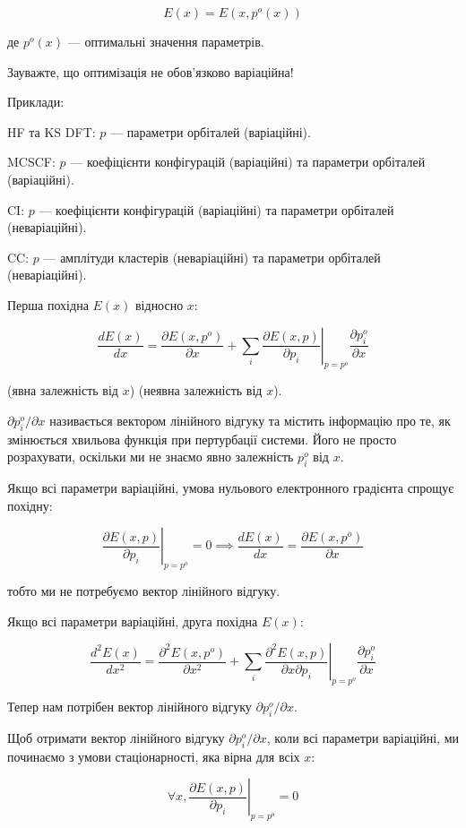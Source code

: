 \documentclass{PySCFBook}
\begin{document}
\[E(x) = E(x, p^o(x))\]

де \(p^o(x)\) — оптимальні значення параметрів.

Зауважте, що оптимізація не обов'язково варіаційна!

Приклади:

HF та KS DFT: \(p\) — параметри орбіталей (варіаційні).

MCSCF: \(p\) — коефіцієнти конфігурацій (варіаційні) та параметри орбіталей (варіаційні).

CI: \(p\) — коефіцієнти конфігурацій (варіаційні) та параметри орбіталей (неваріаційні).

CC: \(p\) — амплітуди кластерів (неваріаційні) та параметри орбіталей (неваріаційні).

Перша похідна \(E(x)\) відносно \(x\):

\[\frac{dE(x)}{dx} = \frac{\partial E(x, p^o)}{\partial x} + \sum_i \left. \frac{\partial E(x, p)}{\partial p_i} \right|_{p=p^o} \frac{\partial p^o_i}{\partial x}\]

(явна залежність від \(x\)) (неявна залежність від \(x\)).

\(\partial p^o_i / \partial x\) називається вектором лінійного відгуку та містить інформацію про те, як змінюється хвильова функція при пертурбації системи. Його не просто розрахувати, оскільки ми не знаємо явно залежність \(p^o_i\) від \(x\).

Якщо всі параметри варіаційні, умова нульового електронного градієнта спрощує похідну:

\[\left. \frac{\partial E(x, p)}{\partial p_i} \right|_{p=p^o} = 0 \implies \frac{dE(x)}{dx} = \frac{\partial E(x, p^o)}{\partial x}\]

тобто ми не потребуємо вектор лінійного відгуку.

Якщо всі параметри варіаційні, друга похідна \(E(x)\):

\[\frac{d^2 E(x)}{dx^2} = \frac{\partial^2 E(x, p^o)}{\partial x^2} + \sum_i \left. \frac{\partial^2 E(x, p)}{\partial x \partial p_i} \right|_{p=p^o} \frac{\partial p^o_i}{\partial x}\]

Тепер нам потрібен вектор лінійного відгуку \(\partial p^o_i / \partial x\).

Щоб отримати вектор лінійного відгуку \(\partial p^o_i / \partial x\), коли всі параметри варіаційні, ми починаємо з умови стаціонарності, яка вірна для всіх \(x\):

\[\forall x, \left. \frac{\partial E(x, p)}{\partial p_i} \right|_{p=p^o} = 0\]
\end{document}

